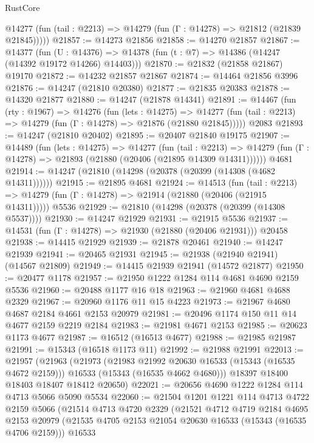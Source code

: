 \begin{lexlean}{RustCore}
\begin{coremodule}
      @14277 (fun (tail : @2213) => @14279 (fun (Γ : @14278) => @21812 (@21839 @21845)))))
@21857 := @14273 @21856
@21858 := @14270 @21857
@21867 := @14377
    (fun (U : @14376) => @14378 (fun (t : @7) => @14386 (@14247 (@14392 @19172 @14266) @14403)))
@21870 := @21832 (@21858 @21867) @19170
@21872 := @14232 @21857 @21867
@21874 := @14464 @21856 @3996
@21876 := @14247 (@21810 @20380)
@21877 := @21835 @20383
@21878 := @14320 @21877
@21880 := @14247 (@21878 @14341)
@21891 := @14467
    (fun (rty : @1967) =>
    @14276
      (fun (lets : @14275) =>
      @14277 (fun (tail : @2213) => @14279 (fun (Γ : @14278) => @21876 (@21880 @21845)))))
    @2083
@21893 := @14247 (@21810 @20402)
@21895 := @20407 @21840 @19175
@21907 := @14489
    (fun (lets : @14275) =>
    @14277
      (fun (tail : @2213) =>
      @14279 (fun (Γ : @14278) => @21893 (@21880 (@20406 (@21895 @14309 @14311))))))
    @4681
@21914 := @14247 (@21810 (@14298 (@20378 (@20399 (@14308 (@4682 @14311))))))
@21915 := @21895 @4681
@21924 := @14513
    (fun (tail : @2213) => @14279 (fun (Γ : @14278) => @21914 (@21880 (@20406 (@21915 @14311)))))
    @5536
@21929 := @21810 (@14298 (@20378 (@20399 (@14308 @5537))))
@21930 := @14247 @21929
@21931 := @21915 @5536
@21937 := @14531 (fun (Γ : @14278) => @21930 (@21880 (@20406 @21931))) @20458
@21938 := @14415 @21929
@21939 := @21878 @20461
@21940 := @14247 @21939
@21941 := @20465 @21931
@21945 := @21938 (@21940 @21941) (@14567 @21809)
@21949 := @14415 @21939 @21941 (@14572 @21877)
@21950 := @20477 @1178
@21957 := @21950 @1222 @1284 @114 @4681 @4690 @2159 @5536
@21960 := @20488 @1177 @16 @18
@21963 := @21960 @4681 @4688 @2329
@21967 := @20960 @1176 @11 @15 @4223
@21973 := @21967 @4680 @4687 @2184 @4661 @2153 @20979
@21981 := @20496 @1174 @150 @11 @14 @4677 @2159 @2219 @2184
@21983 := @21981 @4671 @2153
@21985 := @20623 @1173 @4677
@21987 := @16512 (@16513 @4677)
@21988 := @21985 @21987
@21991 := @15343 (@16518 @1173 @11)
@21992 := @21988 @21991
@22013 := @21957
    (@21963
      (@21973
        (@21983 @21992 @20630 @16533 (@15343 (@16535 @4672 @2159)))
        @16533
        (@15343 (@16535 @4662 @4680)))
      @18397
      @18400
      @18403
      @18407
      @18412
      @20650)
@22021 := @20656 @4690 @1222 @1284 @114 @4713 @5066 @5090 @5534
@22060 := @21504
    @1201
    @1221
    @114
    @4713
    @4722
    @2159
    @5066
    (@21514
      @4713
      @4720
      @2329
      (@21521
        @4712
        @4719
        @2184
        @4695
        @2153
        @20979
        (@21535 @4705 @2153 @21054 @20630 @16533 (@15343 (@16535 @4706 @2159)))
        @16533

\end{coremodule}
\end{lexlean}
